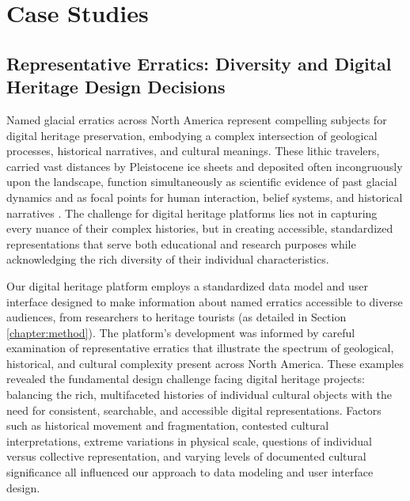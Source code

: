\chapter{Case Studies}
\label{chapter:cases}

\section{Representative Erratics: Diversity and Digital Heritage Design Decisions}
\label{sec:diversity}

Named glacial erratics across North America represent compelling subjects for digital heritage preservation, embodying a complex intersection of geological processes, historical narratives, and cultural meanings. These lithic travelers, carried vast distances by Pleistocene ice sheets and deposited often incongruously upon the landscape, function simultaneously as scientific evidence of past glacial dynamics and as focal points for human interaction, belief systems, and historical narratives \cite{Flint1971, Benn2010}. The challenge for digital heritage platforms lies not in capturing every nuance of their complex histories, but in creating accessible, standardized representations that serve both educational and research purposes while acknowledging the rich diversity of their individual characteristics.

Our digital heritage platform employs a standardized data model and user interface designed to make information about named erratics accessible to diverse audiences, from researchers to heritage tourists (as detailed in Section \ref{chapter:method}). The platform's development was informed by careful examination of representative erratics that illustrate the spectrum of geological, historical, and cultural complexity present across North America. These examples revealed the fundamental design challenge facing digital heritage projects: balancing the rich, multifaceted histories of individual cultural objects with the need for consistent, searchable, and accessible digital representations. Factors such as historical movement and fragmentation, contested cultural interpretations, extreme variations in physical scale, questions of individual versus collective representation, and varying levels of documented cultural significance all influenced our approach to data modeling and user interface design.

